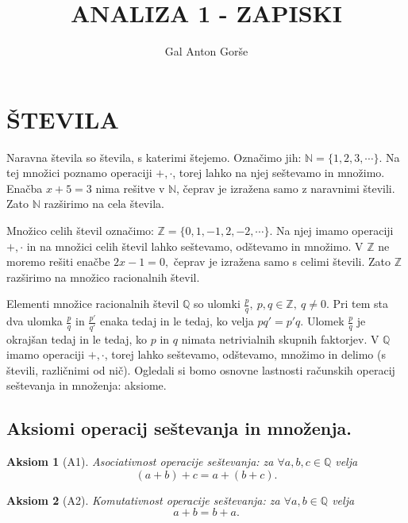\documentclass[10pt, a4paper]{article}
\newtheorem{aksiom}{Aksiom}[section]
\newcommand{\N}{\mathbb {N}}
\newcommand{\Z}{\mathbb {Z}}
\newcommand{\Q}{\mathbb {Q}}
\begin{document}
\title{ANALIZA 1 - ZAPISKI}
\author{Gal Anton Gorše}
\date{}
\maketitle

\tableofcontents

\clearpage
    \section{ŠTEVILA}

Naravna števila so števila, s katerimi štejemo. Označimo jih:
$\mathbb{N} = \{1,2,3,\cdots\}.$   
Na tej množici poznamo operaciji $+,\cdot$, torej lahko na njej seštevamo in množimo.
Enačba $x + 5 = 3$ nima rešitve v $\mathbb{N}$, čeprav je izražena samo z naravnimi števili. Zato $\N$ razširimo na cela števila.
    
Množico celih števil označimo: $\mathbb{Z} = \{0,1,-1,2,-2,\cdots\}.$
Na njej imamo operaciji $+,\cdot$ in na množici celih števil lahko seštevamo, odštevamo in množimo.
V $\Z$ ne moremo rešiti enačbe $2x - 1 = 0,$ čeprav je izražena samo s celimi števili. Zato $\Z$ razširimo na množico racionalnih števil.

Elementi množice racionalnih števil $\Q$ so ulomki $\frac{p}{q},\ p,q \in \mathbb{Z},\ q \neq 0$. Pri tem sta dva ulomka $\frac{p}{q}$ in $\frac{p'}{q'}$ enaka tedaj in le tedaj, ko velja $pq' = p'q$.
Ulomek $\frac{p}{q}$ je okrajšan tedaj in le tedaj, ko $p$ in $q$ nimata netrivialnih skupnih faktorjev.
V $\Q$ imamo operaciji $+,\cdot$, torej lahko seštevamo, odštevamo, množimo in delimo (s števili, različnimi od nič). 
Ogledali si bomo osnovne lastnosti računskih operacij seštevanja in množenja: aksiome.

\subsection{Aksiomi operacij seštevanja in množenja.}

\begin{aksiom}[A1]
    Asociativnost operacije seštevanja: za $\forall a,b,c \in \mathbb{Q}$ velja $$(a+b)+c = a+(b+c).$$
\end{aksiom}

\begin{aksiom}[A2]
    Komutativnost operacije seštevanja: za $\forall a,b \in \mathbb{Q}$ velja $$a+b = b+a.$$
\end{aksiom}
\end{document}
